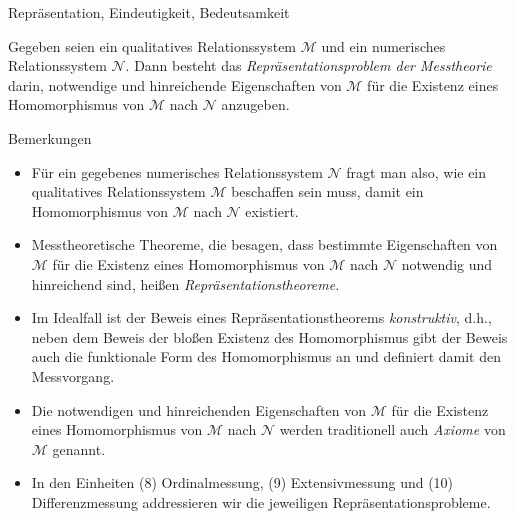 \documentclass[
  8pt,
  ignorenonframetext,
]{beamer}
\providecommand{\tightlist}{%
  \setlength{\itemsep}{0pt}\setlength{\parskip}{0pt}}
\begin{document}
\begin{frame}{Repräsentation, Eindeutigkeit, Bedeutsamkeit}
\protect\hypertarget{repruxe4sentation-eindeutigkeit-bedeutsamkeit}{}
\small
\begin{definition}
\justifying
Gegeben seien ein qualitatives Relationssystem $\mathcal{M}$ und ein numerisches 
Relationssystem $\mathcal{N}$. Dann besteht das \textit{Repräsentationsproblem der Messtheorie} 
darin, notwendige und hinreichende Eigenschaften von $\mathcal{M}$ für die Existenz eines
Homomorphismus von $\mathcal{M}$ nach $\mathcal{N}$ anzugeben.
\end{definition}

\footnotesize

Bemerkungen

\begin{itemize}
\tightlist
\item
  \justifying Für ein gegebenes numerisches Relationssystem
  \(\mathcal{N}\) fragt man also, wie ein qualitatives Relationssystem
  \(\mathcal{M}\) beschaffen sein muss, damit ein Homomorphismus von
  \(\mathcal{M}\) nach \(\mathcal{N}\) existiert.
\item
  Messtheoretische Theoreme, die besagen, dass bestimmte Eigenschaften
  von \(\mathcal{M}\) für die Existenz eines Homomorphismus von
  \(\mathcal{M}\) nach \(\mathcal{N}\) notwendig und hinreichend sind,
  heißen \textit{Repräsentationstheoreme}.
\item
  Im Idealfall ist der Beweis eines Repräsentationstheorems
  \textit{konstruktiv}, d.h., neben dem Beweis der bloßen Existenz des
  Homomorphismus gibt der Beweis auch die funktionale Form des
  Homomorphismus an und definiert damit den Messvorgang.
\item
  Die notwendigen und hinreichenden Eigenschaften von \(\mathcal{M}\)
  für die Existenz eines Homomorphismus von \(\mathcal{M}\) nach
  \(\mathcal{N}\) werden traditionell auch \emph{Axiome} von
  \(\mathcal{M}\) genannt.
\item
  In den Einheiten (8) Ordinalmessung, (9) Extensivmessung und (10)
  Differenzmessung addressieren wir die jeweiligen
  Repräsentationsprobleme.
\end{itemize}
\end{frame}
\end{document}

